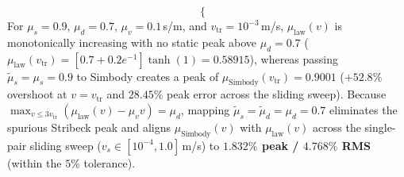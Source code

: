 \documentclass[11pt,a4paper]{article}
\begin{document}
\begin{enumerate}[leftmargin=*,noitemsep]
\begin{equation}
\begin{cases}
\end{cases}
\end{equation}
For $\mu_s = 0.9$, $\mu_d = 0.7$, $\mu_v = 0.1$\,s/m, and $v_{\mathrm{tr}} = 10^{-3}$\,m/s, $\mu_{\mathrm{law}}(v)$ is monotonically increasing with no static peak above $\mu_d = 0.7$ ($\mu_{\mathrm{law}}(v_{\mathrm{tr}}) = [0.7 + 0.2 e^{-1}]\tanh(1) = 0.58915$), whereas passing $\tilde{\mu}_s = \mu_s = 0.9$ to Simbody creates a peak of $\mu_{\mathrm{Simbody}}(v_{\mathrm{tr}}) = 0.9001$ ($+52.8\%$ overshoot at $v = v_{\mathrm{tr}}$ and $28.45\%$ peak error across the sliding sweep). Because $\max_{v \le 3v_{\mathrm{tr}}}(\mu_{\mathrm{law}}(v) - \mu_v v) = \mu_d$, mapping $\tilde{\mu}_s = \tilde{\mu}_d = \mu_d = 0.7$ eliminates the spurious Stribeck peak and aligns $\mu_{\mathrm{Simbody}}(v)$ with $\mu_{\mathrm{law}}(v)$ across the single-pair sliding sweep ($v_s \in [10^{-4}, 1.0]$\,m/s) to \textbf{$1.832\%$ peak / $4.768\%$ RMS} (within the $5\%$ tolerance).

\end{enumerate}
\end{document}
